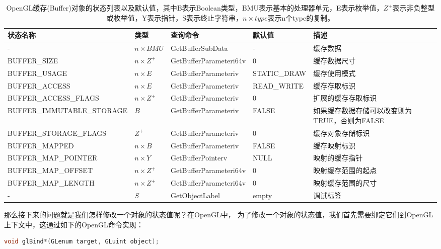\begin{table}
\begin{fullwidth}
\caption{OpenGL缓存(Buffer)对象的状态列表以及默认值，其中B表示Boolean类型，BMU表示基本的处理器单元，E表示枚举值，$Z^{+}$表示非负整型或枚举值，Y表示指针，S表示终止字符串，$n\times type$表示n个type的复制。}
\label{t:api-buffer-state}
\centering
\begin{tabular}{>{\scriptsize}p{0.29\thewidth}|>{\small}P{0.08\thewidth}|>{\small}P{0.21\thewidth}|>{\scriptsize}P{0.13\thewidth}|>{\small}p{0.25\thewidth}}
\hline 
   状态名称&类型&查询命令&默认值&描述  \\
    \hline  
  -& $n\times BMU$ & GetBufferSubData&-&缓存数据\\
  BUFFER\_SIZE& $n\times Z^{+}$ & GetBufferParameteri64v&0&缓存数据尺寸\\
  BUFFER\_USAGE& $n\times E$ & GetBufferParameteriv&STATIC\_DRAW&缓存使用模式\\
  BUFFER\_ACCESS& $n\times E$ & GetBufferParameteriv&READ\_WRITE&缓存存取标识\\
  BUFFER\_ACCESS\_FLAGS& $n\times Z^{+}$ & GetBufferParameteriv&0&扩展的缓存存取标识\\
  BUFFER\_IMMUTABLE\_STORAGE& $B$ & GetBufferParameteriv&FALSE&如果缓存数据存储可以改变则为TRUE，否则为FALSE\\
  BUFFER\_STORAGE\_FLAGS& $Z^{+}$ & GetBufferParameteriv&0&缓存对象存储标识\\
  BUFFER\_MAPPED& $n\times B$ & GetBufferParameteriv&FALSE&缓存映射标识\\
  BUFFER\_MAP\_POINTER& $n\times Y$ & GetBufferPointerv&NULL&映射的缓存指针\\
  BUFFER\_MAP\_OFFSET& $n\times Z^{+}$ & GetBufferParameteri64v&0&映射缓存范围的起点\\
  BUFFER\_MAP\_LENGTH& $n\times Z^{+}$ & GetBufferParameteri64v&0&映射缓存范围的尺寸\\
  -& $S$ & GetObjectLabel&empty&调试标签\\

 \hline 
\end{tabular}
\end{fullwidth}
\end{table}

那么接下来的问题就是我们怎样修改一个对象的状态值呢？在OpenGL中， 为了修改一个对象的状态值，我们首先需要绑定它们到OpenGL上下文中，这通过如下的OpenGL命令实现：

\begin{lstlisting}[language=C++]
void glBind*(GLenum target​, GLuint object​);
\end{lstlisting}

